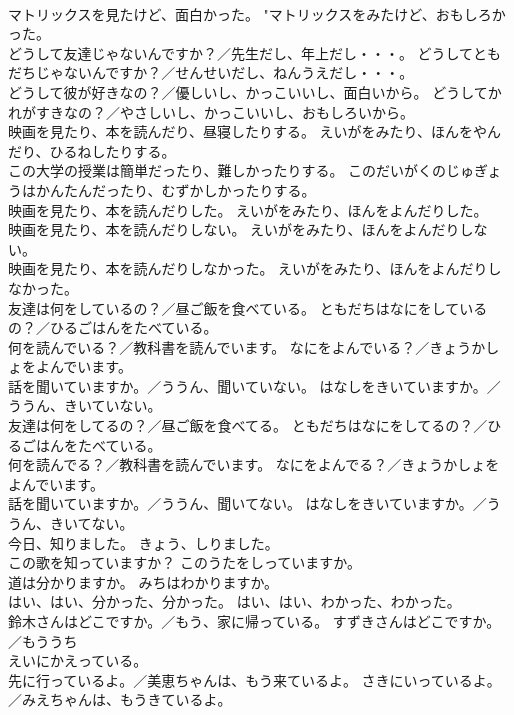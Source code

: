 \documentclass[8pt]{extreport}
\begin{document}
\begin{CJK}{UTF8}{min}
\\	マトリックスを見たけど、面白かった。	"マトリックスをみたけど、おもしろかった。 
\\	どうして友達じゃないんですか？／先生だし、年上だし・・・。	どうしてともだちじゃないんですか？／せんせいだし、ねんうえだし・・・。 
\\	どうして彼が好きなの？／優しいし、かっこいいし、面白いから。	どうしてかれがすきなの？／やさしいし、かっこいいし、おもしろいから。 
\\	映画を見たり、本を読んだり、昼寝したりする。	えいがをみたり、ほんをやんだり、ひるねしたりする。 
\\	この大学の授業は簡単だったり、難しかったりする。	このだいがくのじゅぎょうはかんたんだったり、むずかしかったりする。 
\\	映画を見たり、本を読んだりした。	えいがをみたり、ほんをよんだりした。 
\\	映画を見たり、本を読んだりしない。	えいがをみたり、ほんをよんだりしない。 
\\	映画を見たり、本を読んだりしなかった。	えいがをみたり、ほんをよんだりしなかった。 
\\	友達は何をしているの？／昼ご飯を食べている。	ともだちはなにをしているの？／ひるごはんをたべている。 
\\	何を読んでいる？／教科書を読んでいます。	なにをよんでいる？／きょうかしょをよんでいます。 
\\	話を聞いていますか。／ううん、聞いていない。	はなしをきいていますか。／ううん、きいていない。 
\\	友達は何をしてるの？／昼ご飯を食べてる。	ともだちはなにをしてるの？／ひるごはんをたべている。 
\\	何を読んでる？／教科書を読んでいます。	なにをよんでる？／きょうかしょをよんでいます。 
\\	話を聞いていますか。／ううん、聞いてない。	はなしをきいていますか。／ううん、きいてない。 
\\	今日、知りました。	きょう、しりました。 
\\	この歌を知っていますか？	このうたをしっていますか。 
\\	道は分かりますか。	みちはわかりますか。 
\\	はい、はい、分かった、分かった。	はい、はい、わかった、わかった。 
\\	鈴木さんはどこですか。／もう、家に帰っている。	すずきさんはどこですか。／もう{うち
\\	えい}にかえっている。 
\\	先に行っているよ。／美恵ちゃんは、もう来ているよ。	さきにいっているよ。／みえちゃんは、もうきているよ。 

\end{CJK}
\end{document}
